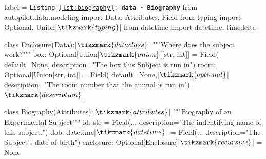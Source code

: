 \begin{listing}[h!]
\begin{pythoncode*}{label = \texttt{Listing \ref{lst:biography}: \textbf{data - Biography}}}
from autopilot.data.modeling import Data, Attributes, Field
from typing import Optional, Union|$\tikzmark{typing}$|
from datetime import datetime, timedelta

class Enclosure(Data):|$\tikzmark{dataclass}$|
    """Where does the subject work?"""
    box:  Optional[Union|$\tikzmark{union}$|[str, int]] = Field(
        default=None,
        description="The box this Subject is run in")
    room: Optional[Union[str, int]] = Field(
        default=None,|$\tikzmark{optional}$|
        description="The room number that the animal is run in")|$\tikzmark{description}$|

class Biography(Attributes):|$\tikzmark{attributes}$|
    """Biography of an Experimental Subject"""
    id:  str = Field(...
        description="The indentifying name of this subject.")
    dob: datetime|$\tikzmark{datetime}$| = Field(... 
        description="The Subject's date of birth")
    enclosure: Optional[Enclosure]|$\tikzmark{recursive}$| = None


\end{pythoncode*}
\end{listing}
